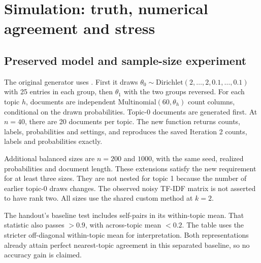 \clearpage
\section{Simulation: truth, numerical agreement and stress}
\subsection{Preserved model and sample-size experiment}
The original generator uses . First it draws
$\theta_0\sim\mathrm{Dirichlet}(2,\ldots,2,0.1,\ldots,0.1)$ with
25 entries in each group, then $\theta_1$ with the two groups reversed.
For each topic $h$, documents are independent
$\mathrm{Multinomial}(60,\theta_h)$ count columns, conditional on
the drawn probabilities. Topic-0 documents are generated first.
At $n=40$, there are 20 documents per topic.
The new  function returns counts, labels,
probabilities and settings, and reproduces the saved Iteration 2
counts, labels and probabilities exactly.

Additional balanced sizes are $n=200$ and $1000$, with the same seed,
realized probabilities and document length. These extensions satisfy
the new requirement for at least three sizes. They are not nested for
topic 1 because the number of earlier topic-0 draws changes.
The observed noisy TF-IDF matrix is not asserted to have rank two.
All sizes use the shared custom method at $k=2$.

The handout's baseline test includes self-pairs in its within-topic mean.
That statistic also passes $>0.9$, with across-topic mean $<0.2$.
The table uses the stricter off-diagonal within-topic mean for interpretation.
Both representations already attain perfect nearest-topic agreement
in this separated baseline, so no accuracy gain is claimed.

